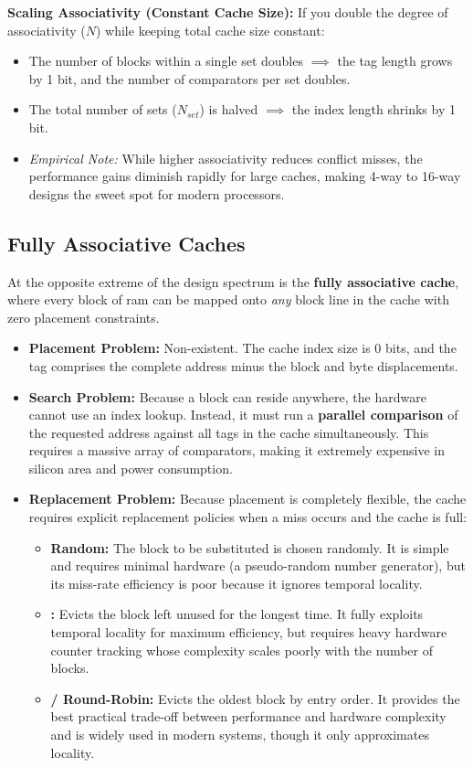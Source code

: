 \noindent \textbf{Scaling Associativity (Constant Cache Size):}
If you double the degree of associativity ($N$) while keeping total cache size constant:
\begin{itemize}
    \item The number of blocks within a single set doubles $\implies$ the tag length grows by 1 bit, and the number of comparators per set doubles.
    \item The total number of sets ($N_{set}$) is halved $\implies$ the index length shrinks by 1 bit.
    \item \emph{Empirical Note:} While higher associativity reduces conflict misses, the performance gains diminish rapidly for large caches, making 4-way to 16-way designs the sweet spot for modern processors.
\end{itemize}

\subsection{Fully Associative Caches}
At the opposite extreme of the design spectrum is the \textbf{fully associative cache}, where every block of \gls{ram} can be mapped onto \emph{any} block line in the cache with zero placement constraints.
\begin{itemize}
    \item \textbf{Placement Problem:} Non-existent. The cache index size is $0$ bits, and the tag comprises the complete address minus the block and byte displacements.
    \item \textbf{Search Problem:} Because a block can reside anywhere, the hardware cannot use an index lookup. Instead, it must run a \textbf{parallel comparison} of the requested address against all tags in the cache simultaneously. This requires a massive array of comparators, making it extremely expensive in silicon area and power consumption.
    \item \textbf{Replacement Problem:} Because placement is completely flexible, the cache requires explicit replacement policies when a miss occurs and the cache is full:
    \begin{itemize}
        \item \textbf{Random:} The block to be substituted is chosen randomly. It is simple and requires minimal hardware (a pseudo-random number generator), but its miss-rate efficiency is poor because it ignores temporal locality.
        \item \textbf{:} Evicts the block left unused for the longest time. It fully exploits temporal locality for maximum efficiency, but requires heavy hardware counter tracking whose complexity scales poorly with the number of blocks.
        \item \textbf{ / Round-Robin:} Evicts the oldest block by entry order. It provides the best practical trade-off between performance and hardware complexity and is widely used in modern systems, though it only approximates locality.
    \end{itemize}
\end{itemize}

